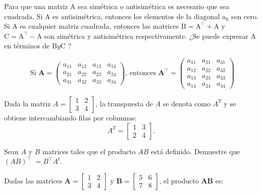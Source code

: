 \begin{}
\begin{definition}
\end{definition}
\begin{remark}
Para que una matriz $\mathrm{A}$ sea simétrica o antisimétrica es necesario que sea cuadrada. Si $\mathrm{A}$ es antisimétrica, entonces los elementos de la diagonal $\mathrm{a}_{\mathrm{ii}}$ son cero. Si $\mathrm{A}$ es cualquier matriz cuadrada, entonces las matrices $\mathrm{B}=\mathrm{A}^{\top}+\mathrm{A}$ y $\mathrm{C}=\mathrm{A}^{\top}-\mathrm{A}$ son simétrica y antisimétrica respectivamente. ¿Se puede expresar $\mathrm{A}$ en términos de $\mathrm{B} y \mathrm{C}$ ?   
\end{remark}

\begin{example}
$$
\text { Si } \boldsymbol{A}=\left(\begin{array}{llll}
a_{11} & a_{12} & a_{13} & a_{14} \\
a_{21} & a_{22} & a_{23} & a_{24} \\
a_{31} & a_{32} & a_{33} & a_{34}
\end{array}\right) \text {, entonces } \boldsymbol{A}^{\boldsymbol{\top}}=\left(\begin{array}{lll}
a_{11} & a_{21} & a_{31} \\
a_{12} & a_{22} & a_{32} \\
a_{13} & a_{23} & a_{33} \\
a_{14} & a_{24} & a_{34}
\end{array}\right)
$$   
\end{example}

\begin{example}
 Dada la matriz $A = \begin{bmatrix} 1 & 2 \\ 3 & 4 \end{bmatrix}$,
la transpuesta de $A$ se denota como $A^T$ y se obtiene intercambiando filas por columnas:
\[ A^T = \begin{bmatrix} 1 & 3 \\ 2 & 4 \end{bmatrix}. \]
\end{example}

\begin{exercise}
Sean $A$ y $B$ matrices tales que el producto $A B$ está definido. Demuestre que $(A B)^{\top}$ $=B^{\top} A^t$. 
\end{exercise}
\begin{solution}
Dadas las matrices $\mathbf{A} = \begin{bmatrix} 1 & 2 \\ 3 & 4 \end{bmatrix}$ y $\mathbf{B} = \begin{bmatrix} 5 & 6 \\ 7 & 8 \end{bmatrix}$, el producto $\boldsymbol{AB}$ es:


\end{solution}
\end{}
